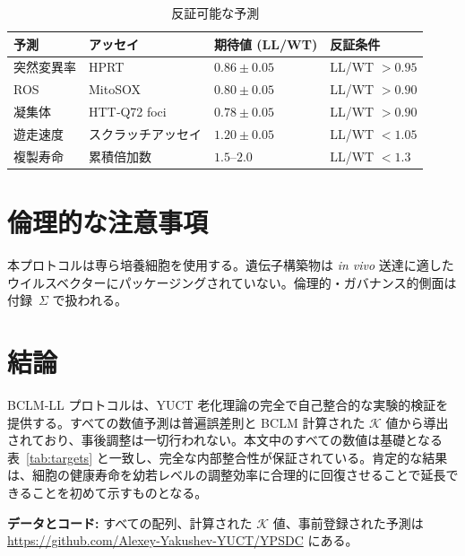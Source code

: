 \documentclass[12pt,a4paper]{ltjsarticle}
\newcommand{\REL}{\mathcal{K}}          %
\begin{document}
	\begin{table}[H]
		\centering
		\caption{反証可能な予測}
		\label{tab:predictions}
		\begin{tabular}{@{}llll@{}}
			\toprule
			\textbf{予測} & \textbf{アッセイ} & \textbf{期待値 (LL/WT)} & \textbf{反証条件} \\
			\midrule
			突然変異率       & HPRT           & \(0.86 \pm 0.05\) & LL/WT \(> 0.95\) \\
			ROS              & MitoSOX        & \(0.80 \pm 0.05\) & LL/WT \(> 0.90\) \\
			凝集体           & HTT‑Q72 foci   & \(0.78 \pm 0.05\) & LL/WT \(> 0.90\) \\
			遊走速度         & スクラッチアッセイ & \(1.20 \pm 0.05\) & LL/WT \(< 1.05\) \\
			複製寿命         & 累積倍加数     & \(1.5\)–\(2.0\)   & LL/WT \(< 1.3\) \\
			\bottomrule
		\end{tabular}
	\end{table}
	
	\section{倫理的な注意事項}
	\label{sec:ethics}
	本プロトコルは専ら培養細胞を使用する。遺伝子構築物は \textit{in vivo} 送達に適したウイルスベクターにパッケージングされていない。倫理的・ガバナンス的側面は付録~\(\Sigma\) で扱われる。
	
	\section{結論}
	BCLM‑LL プロトコルは、YUCT 老化理論の完全で自己整合的な実験的検証を提供する。すべての数値予測は普遍誤差則と BCLM 計算された \(\REL\) 値から導出されており、事後調整は一切行われない。本文中のすべての数値は基礎となる表~\ref{tab:targets} と一致し、完全な内部整合性が保証されている。肯定的な結果は、細胞の健康寿命を幼若レベルの調整効率に合理的に回復させることで延長できることを初めて示すものとなる。
	
	\vspace{0.5cm}
	\noindent\textbf{データとコード:} すべての配列、計算された \(\REL\) 値、事前登録された予測は \url{https://github.com/Alexey-Yakushev-YUCT/YPSDC} にある。
	
\end{document}
